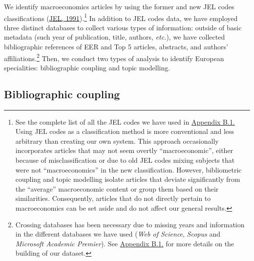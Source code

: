 \documentclass[
  12pt,
  onecolumn]{article}
\begin{document}
We identify macroeconomics articles by using the former and new JEL codes classifications (\protect\hyperlink{ref-jel1991}{JEL, 1991}).\footnote{See the complete list of all the JEL codes we have used in \protect\hyperlink{eer-top5-macro}{Appendix B.1.} Using JEL codes as a classification method is more conventional and less arbitrary than creating our own system. This approach occasionally incorporates articles that may not seem overtly ``macroeconomic'', either because of misclassification or due to old JEL codes mixing subjects that were not ``macroeconomics'' in the new classification. However, bibliometric coupling and topic modelling isolate articles that deviate significantly from the ``average'' macroeconomic content or group them based on their similarities. Consequently, articles that do not directly pertain to macroeconomics can be set aside and do not affect our general results.} In addition to JEL codes data, we have employed three distinct databases to collect various types of information: outside of basic metadata (such year of publication, title, authors, \emph{etc.}), we have collected bibliographic references of EER and Top 5 articles, abstracts, and authors' affiliations.\footnote{Crossing databases has been necessary due to missing years and information in the different databases we have used (\emph{Web of Science}, \emph{Scopus} and \emph{Microsoft Academic Premier}). See \protect\hyperlink{corpus}{Appendix B.1.} for more details on the building of our dataset.} Then, we conduct two types of analysis to identify European specialities: bibliographic coupling and topic modelling.

\hypertarget{bibliographic-coupling}{%
\subsection{Bibliographic coupling}\label{bibliographic-coupling}}
\end{document}
